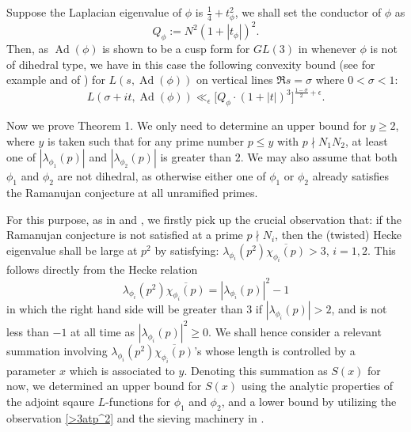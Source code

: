 \documentclass[10pt,leqno]{amsart}
\theoremstyle{plain}
\theoremstyle{definition}
\theoremstyle{remark}
\numberwithin{equation}{section}
\newcommand{\Ad}{\operatorname{Ad}}
\begin{document}
Suppose the Laplacian eigenvalue of $\phi$ is $\frac{1}{4} + t_{\phi}^2$, we shall set the conductor of $\phi$ as 
\[
    Q_{\phi} := N^2(1 + |t_{\phi}|)^2.
\]
Then, as $\Ad(\phi)$ is shown to be a cusp form for $GL(3)$ in \cite{GelbartJacquetMR533066} whenever $\phi$ is not of dihedral type, we have in this case the following convexity bound (see for example \cite[(5.20)]{IwaniecKowalskiMR2061214} and of \cite[Proposition 3.3]{SpehMullerMR2053600}) for $L(s, \Ad(\phi))$ on vertical lines $\Re s = \sigma$ where $0 < \sigma < 1$:
\begin{equation}\label{convexitybound}
    L(\sigma + it, \Ad(\phi)) \ll_{\epsilon} \big[Q_{\phi}\cdot (1 + |t|)^3\big]^{\frac{1-\sigma}{2} + \epsilon}.
\end{equation}


Now we prove Theorem 1.
We only need to determine an upper bound for $y \geq 2$, where $y$ is taken such that for any prime number $p \leq y$ with $p\nmid N_1N_2$, at least one of $|\lambda_{\phi_1}(p)|$ and $|\lambda_{\phi_2}(p)|$ is greater than $2$. We may also assume that both $\phi_1$ and $\phi_2$ are not dihedral, as otherwise either one of $\phi_1$ or $\phi_2$ already satisfies the Ramanujan conjecture at all unramified primes.

For this purpose, as in \cite{RamakrishnanMR1453061} and \cite{LuoZhouMR3928043}, we firstly pick up the crucial observation that: if the Ramanujan conjecture is not satisfied at a prime $p\nmid N_i$, then the (twisted) Hecke eigenvalue shall be large at $p^{2}$ by satisfying: $\lambda_{\phi_i}(p^2)\overline{\chi_{\phi_i}(p)} > 3$, $i=1,2$. This follows directly from the Hecke relation
\begin{equation}\label{>3atp^2}
    \lambda_{\phi_i}(p^2)\overline{\chi_{\phi_i}(p)} = |\lambda_{\phi_i}(p)|^2 - 1
\end{equation}
in which the right hand side will be greater than 3 if $|\lambda_{\phi_i}(p)| > 2$, and is not less than $-1$ at all time as $|\lambda_{\phi_i}(p)|^2 \geq 0$. We shall hence consider a relevant summation involving $\lambda_{\phi_i}(p^2)\overline{\chi_{\phi_i}(p)}$'s  whose length is controlled by a parameter $x$ which is associated to $y$. Denoting this summation as $S(x)$ for now, we determined an upper bound for $S(x)$ using the analytic properties of the adjoint sqaure $L$-functions for $\phi_1$ and $\phi_2$, and a lower bound by utilizing the observation \eqref{>3atp^2} and the sieving machinery in \cite{MatomakiMR2887873}.
\end{document}
